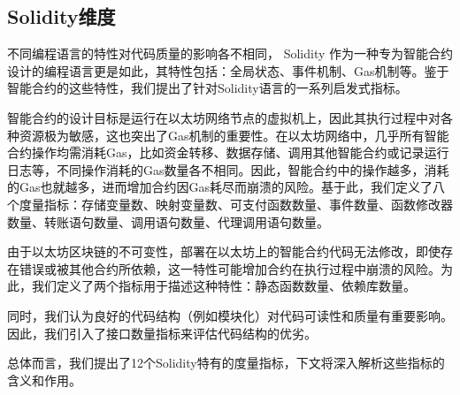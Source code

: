 \subsection{Solidity维度}
不同编程语言的特性对代码质量的影响各不相同， Solidity 作为一种专为智能合约设计的编程语言更是如此，其特性包括：全局状态、事件机制、Gas机制等。鉴于智能合约的这些特性，我们提出了针对Solidity语言的一系列启发式指标。

智能合约的设计目标是运行在以太坊网络节点的虚拟机上，因此其执行过程中对各种资源极为敏感，这也突出了Gas机制的重要性。在以太坊网络中，几乎所有智能合约操作均需消耗Gas，比如资金转移、数据存储、调用其他智能合约或记录运行日志等，不同操作消耗的Gas数量各不相同。因此，智能合约中的操作越多，消耗的Gas也就越多，进而增加合约因Gas耗尽而崩溃的风险。基于此，我们定义了八个度量指标：存储变量数、映射变量数、可支付函数数量、事件数量、函数修改器数量、转账语句数量、调用语句数量、代理调用语句数量。

由于以太坊区块链的不可变性，部署在以太坊上的智能合约代码无法修改，即使存在错误或被其他合约所依赖，这一特性可能增加合约在执行过程中崩溃的风险。为此，我们定义了两个指标用于描述这种特性：静态函数数量、依赖库数量。

同时，我们认为良好的代码结构（例如模块化）对代码可读性和质量有重要影响。因此，我们引入了接口数量指标来评估代码结构的优劣。

总体而言，我们提出了12个Solidity特有的度量指标，下文将深入解析这些指标的含义和作用。

